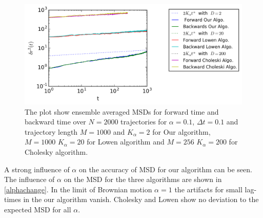 \documentclass[
  a4paper,BCOR10mm,oneside,
  headsepline,footsepline,%
  fleqn,openbib
]{scrbook}
\begin{document}
\begin{figure}[h!]
\centering
\includegraphics[width=\textwidth]{./data/changeintime.png}
\caption{The plot show ensemble averaged MSDs for forward time and backward time over $N=2000$ trajectories for $\alpha =0.1$, $\Delta t = 0.1$ and trajectory length $M=1000$ and $K_{\alpha}=2$ for Our algorithm, $M=1000$  $K_{\alpha}=20 $ for Lowen algorithm and  $M=256$  $K_{\alpha}=200$ for Cholesky algorithm.}
\label{changeintime}
\end{figure} 
A strong influence of $\alpha$ on the accuracy of MSD for our algorithm can be seen. The influence of $\alpha$ on the MSD for the three algorithms are shown in \cref{alphachange}. In the limit of Brownian motion $\alpha=1$ the artifacts for small lag-times in the our algorithm vanish. Cholesky and Lowen show no deviation to the expected MSD for all $\alpha$.
\end{document}
